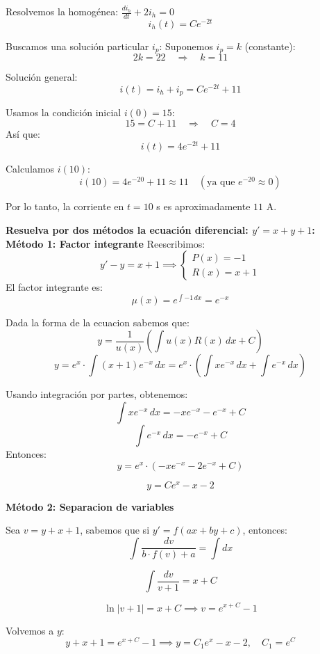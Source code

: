 \documentclass[answers]{exam}
\begin{document}
\begin{questions}
	Resolvemos la homogénea: $\frac{di_h}{dt} + 2i_h = 0$
	\[
		i_h(t) = Ce^{-2t}
	\]

	Buscamos una solución particular $i_p$:
	Suponemos $i_p = k$ (constante):
	\[
		2k = 22 \quad \Rightarrow \quad k = 11
	\]

	Solución general:
	\[
		i(t) = i_h + i_p = Ce^{-2t} + 11
	\]

	Usamos la condición inicial $i(0)=15$:
	\[
		15 = C + 11 \quad \Rightarrow \quad C = 4
	\]
	Así que:
	\[
		i(t) = 4e^{-2t} + 11
	\]

	Calculamos $i(10)$:
	\[
		i(10) = 4e^{-20} + 11 \approx 11 \quad (\text{ya que } e^{-20} \approx 0)
	\]

	Por lo tanto, la corriente en $t=10$ s es aproximadamente $11$ A.

	\vspace{0.5cm}

	\newpage

	\question \large\textbf{Resuelva por dos métodos la ecuación diferencial: $y' = x + y + 1$:}\\


	\textbf{Método 1: Factor integrante}
	Reescribimos:
	\[
		y' - y = x + 1 \implies
		\left\{
		\begin{array}{lcc}
			P(x) = -1 \\
			R(x) = x+1
		\end{array} \right.
	\]
	El factor integrante es:
	\[
		\mu(x) = e^{\int -1 \, dx} = e^{-x}
	\]

	Dada la forma de la ecuacion sabemos que:
	\[
		y = \frac{1}{u(x)} \left(\int{u(x) R(x)  \, dx} + C\right)
	\]
	\[
		y = e^x \cdot \int (x+1)e^{-x} \, dx = e^x \cdot \left(\int xe^{-x} \, dx + \int e^{-x} \, dx\right)
	\]

	Usando integración por partes, obtenemos:
	\[
		\int xe^{-x} \, dx = -xe^{-x} - e^{-x} + C
	\]
	\[
		\int e^{-x} \, dx = - e^{-x} + C
	\]
	Entonces:
	\[
		y = e^x \cdot (-xe^{-x} - 2e^{-x} + C)
	\]

	\[
		\boxed{y = Ce^x -x - 2}
	\]

	\textbf{Método 2: Separacion de variables}

	Sea $v = y + x + 1$, sabemos que si $y' = f(ax+by+c)$, entonces:
	\[
		\int \dfrac{dv}{b\cdot f(v)+a} = \int dx
	\]
	
	\[
		\int \dfrac{dv}{v+1} = x+C
	\]

	\[
		\ln |v+1|=x+C \implies v=e^{x+C}-1
	\]

	Volvemos a $y$:
	\[
		y + x + 1 = e^{x+C}-1 \implies \boxed{y = C_1 e^x - x - 2}, \quad C_1 = e^C
	\]

	\vspace{0.5cm}

\end{questions}
\end{document}
